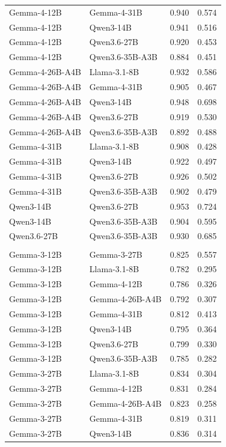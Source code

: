 \begin{longtable}{@{}llrr@{}}
Gemma-4-12B & Gemma-4-31B & 0.940 & 0.574 \\
Gemma-4-12B & Qwen3-14B & 0.941 & 0.516 \\
Gemma-4-12B & Qwen3.6-27B & 0.920 & 0.453 \\
Gemma-4-12B & Qwen3.6-35B-A3B & 0.884 & 0.451 \\
Gemma-4-26B-A4B & Llama-3.1-8B & 0.932 & 0.586 \\
Gemma-4-26B-A4B & Gemma-4-31B & 0.905 & 0.467 \\
Gemma-4-26B-A4B & Qwen3-14B & 0.948 & 0.698 \\
Gemma-4-26B-A4B & Qwen3.6-27B & 0.919 & 0.530 \\
Gemma-4-26B-A4B & Qwen3.6-35B-A3B & 0.892 & 0.488 \\
Gemma-4-31B & Llama-3.1-8B & 0.908 & 0.428 \\
Gemma-4-31B & Qwen3-14B & 0.922 & 0.497 \\
Gemma-4-31B & Qwen3.6-27B & 0.926 & 0.502 \\
Gemma-4-31B & Qwen3.6-35B-A3B & 0.902 & 0.479 \\
Qwen3-14B & Qwen3.6-27B & 0.953 & 0.724 \\
Qwen3-14B & Qwen3.6-35B-A3B & 0.904 & 0.595 \\
Qwen3.6-27B & Qwen3.6-35B-A3B & 0.930 & 0.685 \\
\addlinespace
\multicolumn{4}{l}{\textit{Competence}} \\
Gemma-3-12B & Gemma-3-27B & 0.825 & 0.557 \\
Gemma-3-12B & Llama-3.1-8B & 0.782 & 0.295 \\
Gemma-3-12B & Gemma-4-12B & 0.786 & 0.326 \\
Gemma-3-12B & Gemma-4-26B-A4B & 0.792 & 0.307 \\
Gemma-3-12B & Gemma-4-31B & 0.812 & 0.413 \\
Gemma-3-12B & Qwen3-14B & 0.795 & 0.364 \\
Gemma-3-12B & Qwen3.6-27B & 0.799 & 0.330 \\
Gemma-3-12B & Qwen3.6-35B-A3B & 0.785 & 0.282 \\
Gemma-3-27B & Llama-3.1-8B & 0.834 & 0.304 \\
Gemma-3-27B & Gemma-4-12B & 0.831 & 0.284 \\
Gemma-3-27B & Gemma-4-26B-A4B & 0.823 & 0.258 \\
Gemma-3-27B & Gemma-4-31B & 0.819 & 0.311 \\
Gemma-3-27B & Qwen3-14B & 0.836 & 0.314 \\

\end{longtable}
